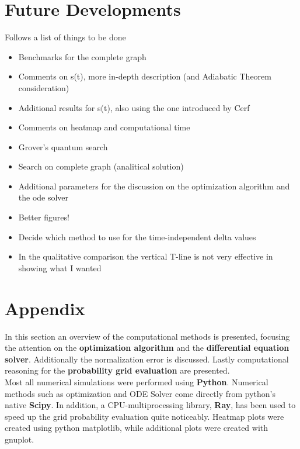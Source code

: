 \documentclass[aps,pra,reprint, onecolumn]{revtex4-2}
\begin{document}
\section{Future Developments}
Follows a list of things to be done
\begin{itemize}
	\item Benchmarks for the complete graph
	\item Comments on s(t), more in-depth description (and Adiabatic Theorem consideration)
	\item Additional results for s(t), also using the one introduced by Cerf
	\item Comments on heatmap and computational time
	\item Grover's quantum search
	\item Search on complete graph (analitical solution)
	\item Additional parameters for the discussion on the optimization algorithm and the ode solver
	\item Better figures!
	\item Decide which method to use for the time-independent delta values
	\item In the qualitative comparison the vertical T-line is not very effective in showing what I wanted

\end{itemize}
\clearpage


\section{Appendix}
In this section an overview of the computational methods is presented, focusing the attention on the \textbf{optimization algorithm} and the \textbf{differential equation solver}. Additionally the normalization error is discussed. Lastly computational reasoning for the \textbf{probability grid evaluation} are presented. \\

Most all numerical simulations were performed using \textbf{Python}. Numerical methods such as optimization and ODE Solver come directly from python's native \textbf{Scipy}. In addition, a CPU-multiprocessing library, \textbf{Ray}, has been used to speed up the grid probability evaluation quite noticeably. Heatmap plots were created using python matplotlib, while additional plots were created with gnuplot.
\end{document}
